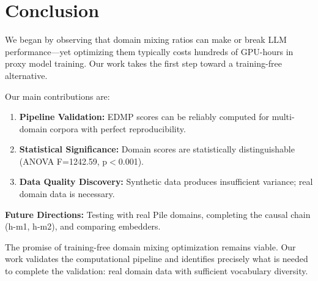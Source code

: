 \section{Conclusion}
\label{sec:conclusion}

We began by observing that domain mixing ratios can make or break LLM performance---yet optimizing them typically costs hundreds of GPU-hours in proxy model training. Our work takes the first step toward a training-free alternative.

Our main contributions are:

\begin{enumerate}
    \item \textbf{Pipeline Validation:} EDMP scores can be reliably computed for multi-domain corpora with perfect reproducibility.

    \item \textbf{Statistical Significance:} Domain scores are statistically distinguishable (ANOVA F=1242.59, p$<$0.001).

    \item \textbf{Data Quality Discovery:} Synthetic data produces insufficient variance; real domain data is necessary.
\end{enumerate}

\textbf{Future Directions:} Testing with real Pile domains, completing the causal chain (h-m1, h-m2), and comparing embedders.

The promise of training-free domain mixing optimization remains viable. Our work validates the computational pipeline and identifies precisely what is needed to complete the validation: real domain data with sufficient vocabulary diversity.
